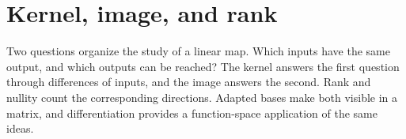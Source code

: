\chapter{Kernel, image, and rank}
\label{ch:linear-algebra-i:kernel-image-and-rank}

Two questions organize the study of a linear map. Which inputs have the
same output, and which outputs can be reached? The kernel answers the
first question through differences of inputs, and the image answers the
second. Rank and nullity count the corresponding directions. Adapted bases
make both visible in a matrix, and differentiation provides a function-space
application of the same ideas.






